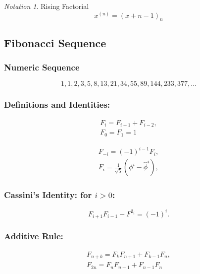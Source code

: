 \documentclass[10pt,a4paper,titlepage,twoside,draft]{article}
\theoremstyle{plain}
\theoremstyle{definition}
\theoremstyle{remark}
\newtheorem{nota}{Notation}
\begin{document}
\begin{nota}{Rising Factorial} \\
 \[x^{(n)}={(x+n-1)}_{n}\]
\end{nota}


\pagebreak

\clearpage

\subsection{Fibonacci Sequence}


\subsubsection{Numeric Sequence}

\[1, 1, 2, 3, 5, 8, 13, 21, 34, 55, 89, 144, 233, 377, \ldots \]

\medskip

\subsubsection{Definitions and Identities:}


\begin{align}
 	F_{i} = F_{i-1} + F_{i-2}, \\
	F_{0} = F_{1} = 1
\end{align}

\begin{align}
 F_{-i} = (-1)^{i-1} F_{i}, \\
F_{i} = \frac{1}{\sqrt{5}} \left(\phi^{i} - \hat{\phi}^{i}\right),
\end{align}

\subsubsection{Cassini's Identity: for $i > 0$:}

\[F_{i+1} F_{i-1} - F^{2_{i}} = (-1)^{i}.\]

\smallskip

\subsubsection{Additive Rule:}





\begin{align}
F_{n+k} = F_{k} F_{n+1} + F_{k-1} F_{n}, \\
F_{2n} = F_{n} F_{n+1} + F_{n-1} F_{n}
\end{align}
\end{document}

